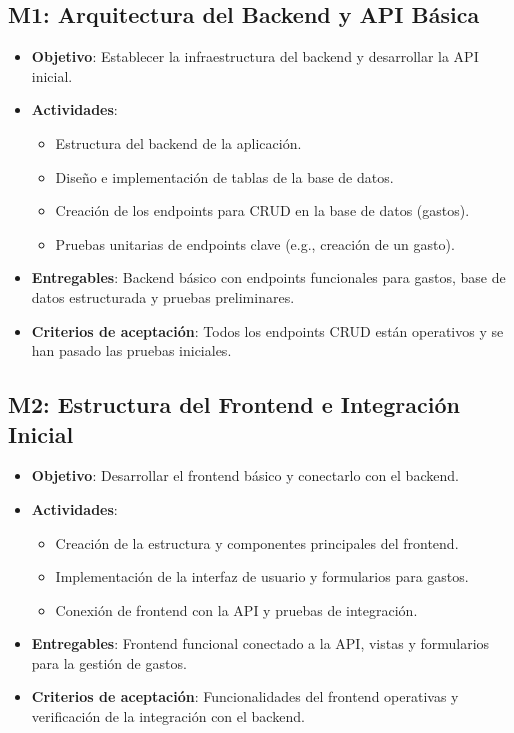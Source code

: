 \subsection{M1: Arquitectura del Backend y API Básica}
\begin{itemize}
    \item \textbf{Objetivo}: Establecer la infraestructura del backend y desarrollar la API inicial.
    \item \textbf{Actividades}:
        \begin{itemize}
            \item Estructura del backend de la aplicación.
            \item Diseño e implementación de tablas de la base de datos.
            \item Creación de los endpoints para CRUD en la base de datos (gastos).
            \item Pruebas unitarias de endpoints clave (e.g., creación de un gasto).
        \end{itemize}
    \item \textbf{Entregables}: Backend básico con endpoints funcionales para gastos, base de datos estructurada y pruebas preliminares.
    \item \textbf{Criterios de aceptación}: Todos los endpoints CRUD están operativos y se han pasado las pruebas iniciales.
\end{itemize}

\subsection{M2: Estructura del Frontend e Integración Inicial}
\begin{itemize}
    \item \textbf{Objetivo}: Desarrollar el frontend básico y conectarlo con el backend.
    \item \textbf{Actividades}:
        \begin{itemize}
            \item Creación de la estructura y componentes principales del frontend.
            \item Implementación de la interfaz de usuario y formularios para gastos.
            \item Conexión de frontend con la API y pruebas de integración.
        \end{itemize}
    \item \textbf{Entregables}: Frontend funcional conectado a la API, vistas y formularios para la gestión de gastos.
    \item \textbf{Criterios de aceptación}: Funcionalidades del frontend operativas y verificación de la integración con el backend.
\end{itemize}

